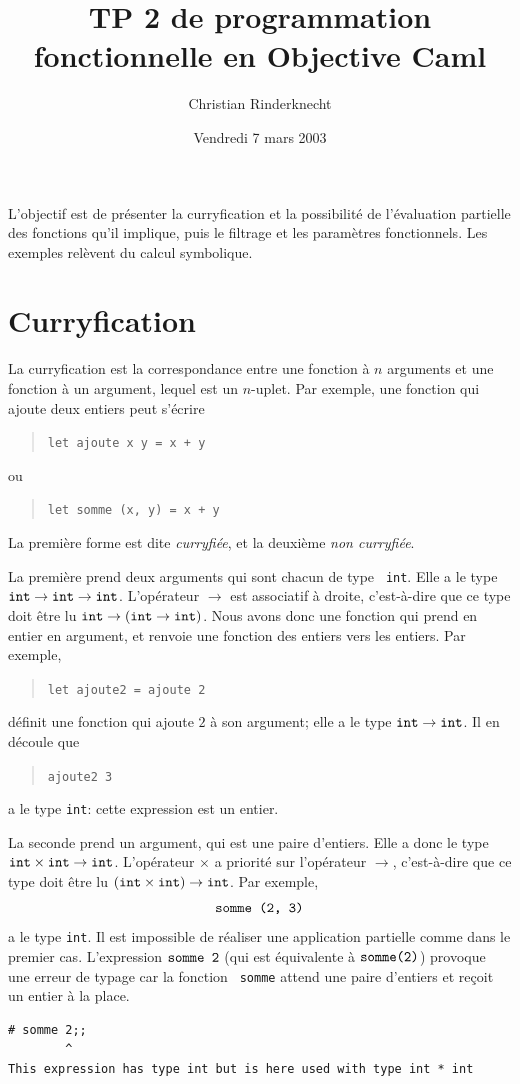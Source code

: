 \documentclass[11pt, a4paper]{article}
\title{TP 2 de programmation fonctionnelle en Objective Caml}
\author{Christian Rinderknecht}
\date{Vendredi 7 mars 2003}
\begin{document}
\maketitle

L'objectif est de présenter la curryfication et la possibilité de
l'évaluation partielle des fonctions qu'il implique, puis le filtrage
et les paramètres fonctionnels. Les exemples relèvent du calcul
symbolique.

\section{Curryfication}

La curryfication est la correspondance entre une fonction à $n$
arguments et une fonction à un argument, lequel est un $n$-uplet. Par
exemple, une fonction qui ajoute deux entiers peut s'écrire
\begin{quote}
\verb|let ajoute x y = x + y|
\end{quote}
ou
\begin{quote}
\verb|let somme (x, y) = x + y|
\end{quote}

La première forme est dite {\em curryfiée}, et la deuxième {\em non
curryfiée}.

La première prend deux arguments qui sont chacun de type {\tt
int}. Elle a le type $\mbox{\tt int}\rightarrow\mbox{\tt
int}\rightarrow\mbox{\tt int}$. L'opérateur $\rightarrow$ est
associatif à droite, c'est-à-dire que ce type doit être lu $\mbox{\tt
int}\rightarrow(\mbox{\tt int}\rightarrow\mbox{\tt int})$.  Nous avons
donc une fonction qui prend en entier en argument, et renvoie une
fonction des entiers vers les entiers.  Par exemple,
\begin{quote}
\verb|let ajoute2 = ajoute 2|
\end{quote}
définit une fonction qui ajoute $2$ à son argument; elle a le type
$\mbox{\tt int}\rightarrow\mbox{\tt int}$. Il en découle que
\begin{quote}
\verb|ajoute2 3|
\end{quote}
a le type {\tt int}: cette expression est un entier.

La seconde prend un argument, qui est une paire d'entiers. Elle a donc
le type $\mbox{\tt int}\times\mbox{\tt int}\rightarrow\mbox{\tt int}$.
L'opérateur $\times$ a priorité sur l'opérateur $\rightarrow$,
c'est-à-dire que ce type doit être lu $(\mbox{\tt int}\times\mbox{\tt
int})\rightarrow\mbox{\tt int}$.  Par exemple,
$$\verb|somme (2, 3)|$$ a le type {\tt int}. Il est impossible de
réaliser une application partielle comme dans le premier cas.
L'expression $\verb|somme 2|$ (qui est équivalente à
$\verb|somme(2)|$) provoque une erreur de typage car la fonction {\tt
  somme} attend une paire d'entiers et reçoit un entier à la place.
{\small
\begin{verbatim}
# somme 2;;
        ^
This expression has type int but is here used with type int * int
\end{verbatim}
}
\end{document}
